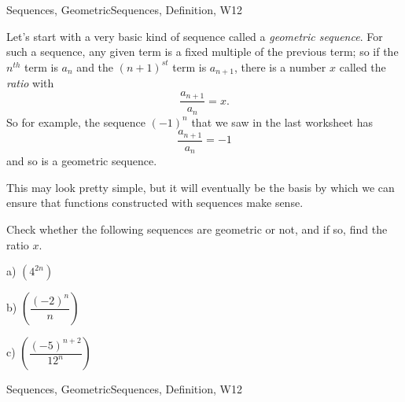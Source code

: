 \begin{tagblock}{Sequences, GeometricSequences, Definition, W12}
\begin{question}

Let's start with a very basic kind of sequence called a \textit{geometric sequence}. For such a sequence, any given term is a fixed multiple of the previous term; so if the $n^{th}$ term is $a_n$ and the $(n+1)^{st}$ term is $a_{n+1}$, there is a number $x$ called the \textit{ratio} with
\[
\frac{a_{n+1}}{a_n}=x.
\]
So for example, the sequence $(-1)^n$ that we saw in the last worksheet has
\[
\frac{a_{n+1}}{a_n}=-1
\]
and so is a geometric sequence.

This may look pretty simple, but it will eventually be the basis by which we can ensure that functions constructed with sequences make sense. 

Check whether the following sequences are geometric or not, and if so, find the ratio $x$.

\bigskip

a) $\left(4^{2n}\right)$
 
\bigskip

b) $\left(\dfrac{(-2)^n} n\right)$

\bigskip

c) $\left(\dfrac{(-5)^{n+2}} {12^n}\right)$

	
	
\begin{tags}
	    Sequences, GeometricSequences, Definition, W12
\end{tags}
	
\begin{diary}
	   
\end{diary}

\begin{solution}	

\end{solution}
	
\end{question}

\end{tagblock}




